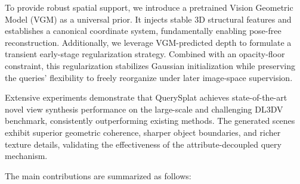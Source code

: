 \documentclass[letterpaper]{article} %
\begin{document}
To provide robust spatial support, we introduce a pretrained Vision Geometric Model (VGM) as a universal prior. It injects stable 3D structural features and establishes a canonical coordinate system, fundamentally enabling pose-free reconstruction. Additionally, we leverage VGM-predicted depth to formulate a transient early-stage regularization strategy. Combined with an opacity-floor constraint, this regularization stabilizes Gaussian initialization while preserving the queries' flexibility to freely reorganize under later image-space supervision.


Extensive experiments demonstrate that QuerySplat achieves state-of-the-art novel view synthesis performance on the large-scale and challenging DL3DV benchmark, consistently outperforming existing methods. The generated scenes exhibit superior geometric coherence, sharper object boundaries, and richer texture details, validating the effectiveness of the attribute-decoupled query mechanism.

The main contributions are summarized as follows:

\end{document}
